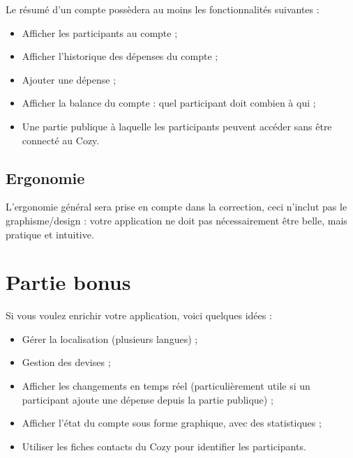 \documentclass{42-fr}
\begin{document}
        Le r\'esum\'e d'un compte poss\`edera au moins les fonctionnalit\'es suivantes :\\

        \begin{itemize}\itemsep1pt
            \item Afficher les participants au compte ;
            \item Afficher l'historique des d\'epenses du compte ;
			\item Ajouter une d\'epense ;
			\item Afficher la balance du compte : quel participant doit combien \`a qui ;
	        \item Une partie publique \`a laquelle les participants peuvent acc\'eder sans
				\^etre connect\'e au Cozy.
        \end{itemize}


    \section{Ergonomie}

        L'ergonomie g\'en\'eral sera prise en compte dans la correction,
		ceci n'inclut pas le graphisme/design : votre application ne doit
		pas n\'ecessairement \^etre belle, mais pratique et intuitive.




\chapter{Partie bonus}

    Si vous voulez enrichir votre application, voici quelques id\'ees :\newline

    \begin{itemize}\itemsep1pt
		\item G\'erer la localisation (plusieurs langues) ;
        \item Gestion des devises ;
		\item Afficher les changements en temps r\'eel (particuli\`erement utile si
			un participant ajoute une d\'epense depuis la partie publique) ;
		\item Afficher l'\'etat du compte sous forme graphique, avec des statistiques ;
		\item Utiliser les fiches contacts du Cozy pour identifier les participants.
    \end{itemize}
\end{document}
